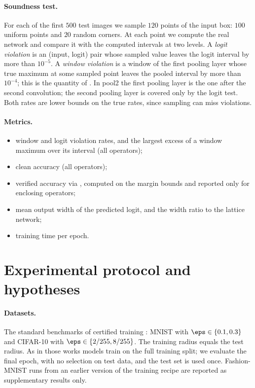 \paragraph{Soundness test.} For each of the first $500$ test images we sample $120$ points of the input box: $100$ uniform points and $20$ random corners. At each point we compute the real network and compare it with the computed intervals at two levels. A \emph{logit violation} is an (input, logit) pair whose sampled value leaves the logit interval by more than $10^{-5}$. A \emph{window violation} is a window of the first pooling layer whose true maximum at some sampled point leaves the pooled interval by more than $10^{-4}$; this is the quantity of . In pool2 the first pooling layer is the one after the second convolution; the second pooling layer is covered only by the logit test. Both rates are lower bounds on the true rates, since sampling can miss violations.

\paragraph{Metrics.}
\begin{itemize}
\item window and logit violation rates, and the largest excess of a window maximum over its interval (all operators);
\item clean accuracy (all operators);
\item verified accuracy via , computed on the margin bounds and reported only for enclosing operators;
\item mean output width of the predicted logit, and the width ratio to the lattice network;
\item training time per epoch.
\end{itemize}

\section{Experimental protocol and hypotheses}
\label{sec:protocol}

\paragraph{Datasets.} The standard benchmarks of certified training \cite{shi2021,mao2024ctbench}: MNIST \cite{lecun1998} with $\eps\in\{0.1,0.3\}$ and CIFAR-10 \cite{krizhevsky2009} with $\eps\in\{2/255,8/255\}$. The training radius equals the test radius. As in those works models train on the full training split; we evaluate the final epoch, with no selection on test data, and the test set is used once. Fashion-MNIST \cite{xiao2017fmnist} runs from an earlier version of the training recipe are reported as supplementary results only.

